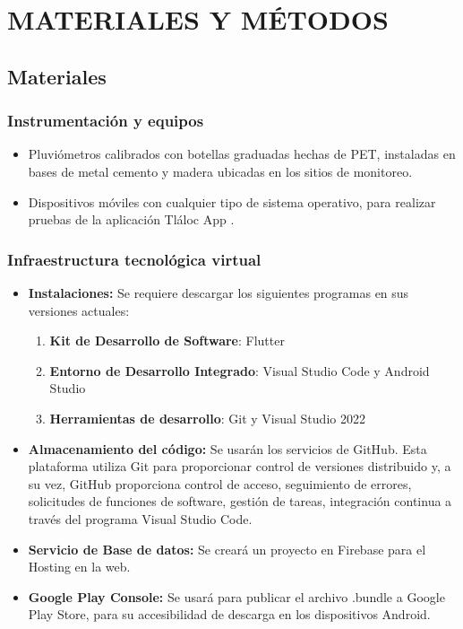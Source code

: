 \chapter{MATERIALES Y MÉTODOS}


\section{Materiales}
\subsection{Instrumentación y equipos}
\begin{itemize}
    \item Pluviómetros calibrados con botellas graduadas hechas de PET, instaladas en bases de metal cemento y madera ubicadas en los sitios de monitoreo.
    \item Dispositivos móviles con cualquier tipo de sistema operativo, para realizar pruebas de la aplicación Tláloc App .
\end{itemize}

\subsection{Infraestructura tecnológica virtual}

\begin{itemize}
        \item \textbf{Instalaciones:} Se requiere descargar los siguientes programas en sus versiones actuales: \begin{enumerate}
        \item \textbf{Kit de Desarrollo de Software}: Flutter
        \item \textbf{Entorno de Desarrollo Integrado}: Visual Studio Code y Android Studio
        \item \textbf{Herramientas de desarrollo}: Git y Visual Studio 2022  
    \end{enumerate}
    \item \textbf{Almacenamiento del código:} Se usarán los servicios de GitHub. Esta plataforma utiliza Git para proporcionar control de versiones distribuido y, a su vez, GitHub proporciona control de acceso, seguimiento de errores, solicitudes de funciones de software, gestión de tareas, integración continua a través del programa Visual Studio Code.
    \item \textbf{Servicio de Base de datos:} Se creará un proyecto en Firebase para el Hosting en la web.
    \item \textbf{Google Play Console:} Se usará para publicar el archivo .bundle a Google Play Store, para su accesibilidad de descarga en los dispositivos Android.
\end{itemize}

